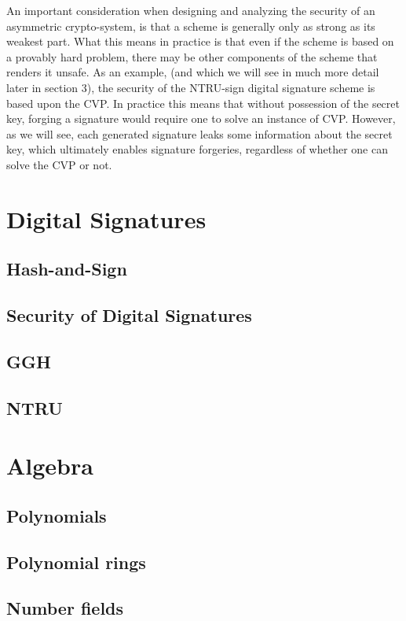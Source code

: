 An important consideration when designing and analyzing the security of an asymmetric crypto-system, is that a scheme is generally only as strong as its weakest part. 
What this means in practice is that even if the scheme is based on a provably hard problem, there may be other components of the scheme that renders it unsafe.
As an example, (and which we will see in much more detail later in section 3), the security of the NTRU-sign digital signature scheme is based upon the CVP. 
In practice this means that without possession of the secret key, forging a signature would require one to solve an instance of CVP. 
However, as we will see, each generated signature leaks some information about the secret key, which ultimately enables signature forgeries, regardless of whether one can 
solve the CVP or not. 

\section{Digital Signatures}
\subsection{Hash-and-Sign}
\subsection{Security of Digital Signatures}
\subsection{GGH}
\subsection{NTRU}

\section{Algebra}
\subsection{Polynomials}
\subsection{Polynomial rings}
\subsection{Number fields}

